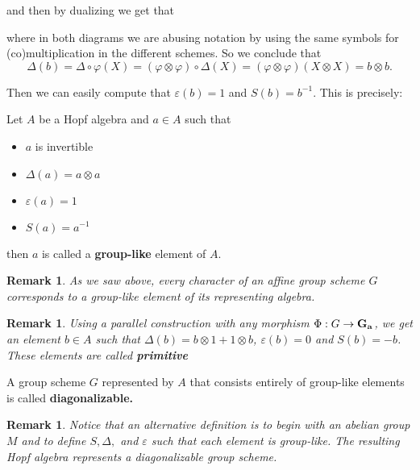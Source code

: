\documentclass[12pt]{article}
\theoremstyle{nonumberbreak}
\theoremstyle{changebreak}
\theoremstyle{nonumberplain}
\theoremstyle{change}
\newtheorem{rmk}[thm]{Remark}
\DeclareMathOperator{\Ga}{\ensuremath\mathbf{G_a}}
\begin{document}
\noindent and then by dualizing we get that
\newpage
\begin{figure}[h]
\end{figure}

\noindent where in both diagrams we are abusing notation by using the same symbols for 
(co)multiplication in the different schemes. So we conclude that 
\[\Delta(b)=\Delta\circ\varphi(X)=(\varphi\otimes\varphi)\circ \Delta(X)=(\varphi\otimes\varphi)(X\otimes X)=b\otimes b.\]

Then we can easily compute that $\varepsilon(b)=1$ and $S(b)=b^{-1}$. This is precisely:
\begin{defn}
	Let $A$ be a Hopf algebra and $a\in A$ such that
	\begin{itemize}
		\item $a$ is invertible
		\item $\Delta(a)=a\otimes a$
		\item $\varepsilon(a)=1$
		\item $S(a)=a^{-1}$
	\end{itemize}
	then $a$ is called a \textbf{group-like} element of $A$.
\end{defn}
\begin{rmk}
	As we saw above, every character of an affine group scheme $G$ corresponds to a 
	group-like element of its representing algebra.
\end{rmk}
\begin{rmk}
	Using a parallel construction with any morphism $\Phi:G\to\Ga$, we get an element $b\in A$
	such that $\Delta(b)=b\otimes 1+1\otimes b$, $\varepsilon(b)=0$ and $S(b)=-b$. These elements
	are called \textbf{primitive}
\end{rmk}

\begin{defn}
	A group scheme $G$ represented by $A$ that consists entirely of group-like elements is
	called \textbf{diagonalizable.}
\end{defn}
\begin{rmk}\label{rmk-diag}
	Notice that an alternative definition is to begin with an abelian group $M$ and to 
	define $S,\Delta,$ and $\varepsilon$ such that each element is group-like. The resulting
	Hopf algebra represents a diagonalizable group scheme.
\end{rmk}
\end{document}
